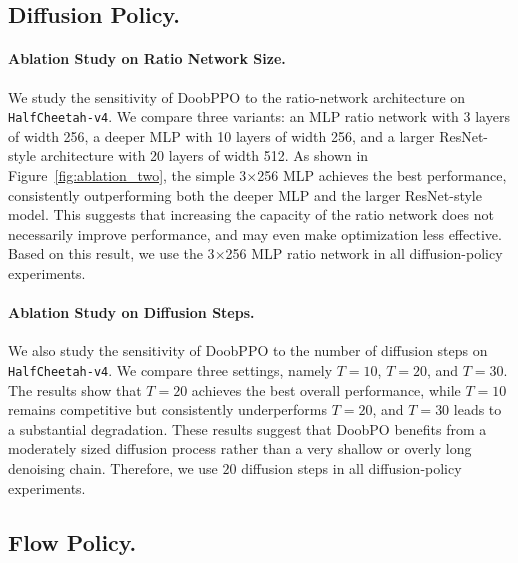 \subsection{Diffusion Policy.}

\paragraph{Ablation Study on Ratio Network Size.}
We study the sensitivity of DoobPPO to the ratio-network architecture on \texttt{HalfCheetah-v4}.
We compare three variants: an MLP ratio network with 3 layers of width 256, a deeper MLP with 10 layers of width 256, and a larger ResNet-style architecture with 20 layers of width 512.
As shown in Figure~\ref{fig:ablation_two}, the simple 3$\times$256 MLP achieves the best performance, consistently outperforming both the deeper MLP and the larger ResNet-style model.
This suggests that increasing the capacity of the ratio network does not necessarily improve performance, and may even make optimization less effective.
Based on this result, we use the 3$\times$256 MLP ratio network in all diffusion-policy experiments.

\paragraph{Ablation Study on Diffusion Steps.}
We also study the sensitivity of DoobPPO to the number of diffusion steps on \texttt{HalfCheetah-v4}.
We compare three settings, namely $T=10$, $T=20$, and $T=30$.
The results show that $T=20$ achieves the best overall performance, while $T=10$ remains competitive but consistently underperforms $T=20$, and $T=30$ leads to a substantial degradation.
These results suggest that DoobPO benefits from a moderately sized diffusion process rather than a very shallow or overly long denoising chain.
Therefore, we use $20$ diffusion steps in all diffusion-policy experiments.

\subsection{Flow Policy.}

